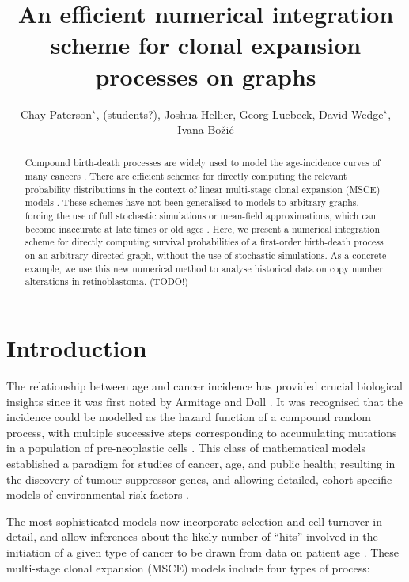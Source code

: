 \documentclass{article}
\title{An efficient numerical integration scheme for clonal expansion processes on graphs}
\author{Chay Paterson${}^\star$, (students?), Joshua Hellier, Georg Luebeck, David Wedge${}^\star$, Ivana Bo\v{z}i\'{c}}
\begin{document}
\maketitle

\begin{abstract}
Compound birth-death processes are widely used to model the age-incidence curves
of many cancers \cite{luebeck2013impact}. There are efficient schemes for
directly computing the relevant %
probability distributions in the context of linear multi-stage clonal expansion
(MSCE) models \cite{meza2008age}. These schemes have not been generalised to
models to arbitrary graphs, forcing the use of full stochastic simulations or
mean-field approximations, which can become inaccurate at late times or old ages
\cite{cpaterson2020,Paterson2021vs}.
Here, we present a numerical integration scheme for directly computing survival
probabilities of a first-order birth-death process on an arbitrary
directed graph, without the use of stochastic
simulations. As a concrete example, we use this new numerical method to analyse
historical data on copy number alterations in retinoblastoma. (TODO!)
\end{abstract}

\section{Introduction}

The relationship between age and cancer incidence has provided crucial
biological insights since it was first noted by Armitage and Doll
\cite{armitage_doll,armitage1957two,knudson1971mutation}. It was 
recognised that the incidence could be modelled as the hazard function of a
compound random process, with multiple successive steps corresponding to
accumulating mutations in a population of pre-neoplastic cells
\cite{armitage_doll,moolgavkar1979two}. This class of mathematical models
established a paradigm for studies of cancer, age, and public health; resulting
in the discovery of tumour suppressor genes, and allowing detailed,
cohort-specific models of environmental risk factors
\cite{knudson1971mutation,conolly2003biologically,meza2008age}. 

The most sophisticated
models now incorporate selection and cell turnover in detail, and allow
inferences about the likely number of ``hits'' involved in the initiation of a
given type of cancer to be drawn from data on patient age \cite{moolgavkar1992multistage,luebeck2013impact}. These multi-stage clonal expansion (MSCE) models include four types of process:
\end{document}
